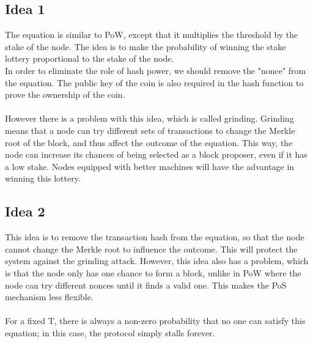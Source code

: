 \documentclass{report}
\begin{document}
\subsection{Idea 1}
The equation is similar to PoW, except that it multiplies the threshold by the stake of the node. The idea is to make the probability of winning the stake lottery proportional to the stake of the node.\\
In order to eliminate the role of hash power, we should remove the "nonce" from the equation. The public key of the coin is also required in the hash function to prove the ownership of the coin.\\\\
However there is a problem with this idea, which is called grinding. Grinding means that a node can try different sets of transactions to change the Merkle root of the block, and thus affect the outcome of the equation. This way, the node can increase its chances of being selected as a block proposer, even if it has a low stake. Nodes equipped with better machines will have the advantage in winning this lottery.

\subsection*{Idea 2}
This idea is to remove the transaction hash from the equation, so that the node cannot change the Merkle root to influence the outcome. This will protect the system against the grinding attack.
However, this idea also has a problem, which is that the node only has one chance to form a block, unlike in PoW where the node can try different nonces until it finds a valid one. This makes the PoS mechanism less flexible.\\\\
For a fixed T, there is always a non-zero probability that no one can satisfy this equation; in this case, the protocol simply stalls forever.
\end{document}
